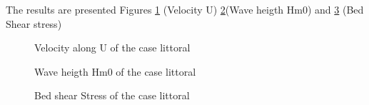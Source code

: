 The results are presented Figures \ref{resultsT2D} (Velocity U) \ref{resultsTOM}(Wave heigth Hm0) and  \ref{resultsSIS} (Bed Shear stress)
\begin{figure} [!h]
\centering
{}
 \caption{Velocity along U of the case littoral}
\label{resultsT2D}
\end{figure}
\begin{figure} [!h]
\centering
{}
 \caption{Wave heigth Hm0 of the case littoral}
\label{resultsTOM}
\end{figure}
\begin{figure} [!h]
\centering
{}
 \caption{Bed shear Stress of the case littoral}
\label{resultsSIS}
\end{figure}



